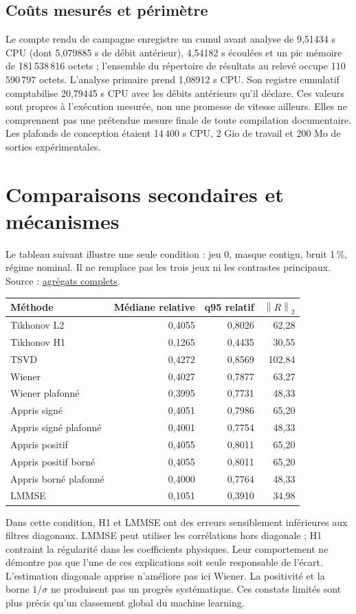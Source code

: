 \documentclass[11pt,a4paper]{article}
\newcommand{\norm}[1]{\left\lVert#1\right\rVert}
\newcommand{\src}[2]{\href{\DataURL{#1}}{#2}}
\begin{document}
\subsection{Coûts mesurés et périmètre}
Le compte rendu de campagne enregistre un cumul avant analyse de 9,51434 s CPU (dont 5,079885 s de débit antérieur), 4,54182 s écoulées et un pic mémoire de 181\,538\,816 octets ; l’ensemble du répertoire de résultats au relevé occupe 110\,590\,797 octets. L'analyse primaire prend 1,08912 s CPU. Son registre cumulatif comptabilise 20,79445 s CPU avec les débits antérieurs qu'il déclare. Ces valeurs sont propres à l'exécution mesurée, non une promesse de vitesse ailleurs. Elles ne comprennent pas une prétendue mesure finale de toute compilation documentaire. Les plafonds de conception étaient 14\,400 s CPU, 2 Gio de travail et 200 Mo de sorties expérimentales.
\clearpage

\section{Comparaisons secondaires et mécanismes}
Le tableau suivant illustre une seule condition : jeu 0, masque contigu, bruit 1\,\%, régime nominal. Il ne remplace pas les trois jeux ni les contrastes principaux. Source : \src{results/analysis/summary.csv}{agrégats complets}.
\begin{center}\small\begin{tabular}{lrrr}\toprule
Méthode & Médiane relative & q95 relatif & $\norm R_2$\\\midrule
Tikhonov L2 & 0,4055 & 0,8026 & 62,28\\
Tikhonov H1 & 0,1265 & 0,4435 & 30,55\\
TSVD & 0,4272 & 0,8569 & 102,84\\
Wiener & 0,4027 & 0,7877 & 63,27\\
Wiener plafonné & 0,3995 & 0,7731 & 48,33\\
Appris signé & 0,4051 & 0,7986 & 65,20\\
Appris signé plafonné & 0,4001 & 0,7754 & 48,33\\
Appris positif & 0,4055 & 0,8011 & 65,20\\
Appris positif borné & 0,4055 & 0,8011 & 65,20\\
Appris borné plafonné & 0,4000 & 0,7764 & 48,33\\
LMMSE & 0,1051 & 0,3910 & 34,98\\\bottomrule
\end{tabular}\end{center}
Dans cette condition, H1 et LMMSE ont des erreurs sensiblement inférieures aux filtres diagonaux. LMMSE peut utiliser les corrélations hors diagonale ; H1 contraint la régularité dans les coefficients physiques. Leur comportement ne démontre pas que l'une de ces explications soit seule responsable de l'écart. L'estimation diagonale apprise n'améliore pas ici Wiener. La positivité et la borne $1/\sigma$ ne produisent pas un progrès systématique. Ces constats limités sont plus précis qu'un classement global du machine learning.
\end{document}
